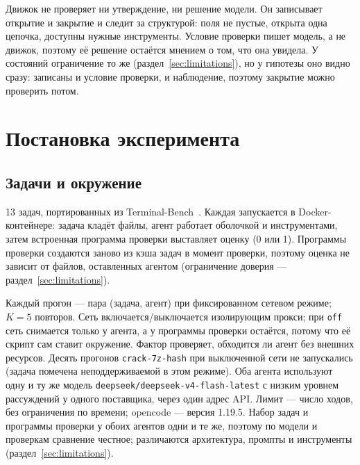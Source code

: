 \documentclass[11pt,a4paper]{article}
\begin{document}
Движок не проверяет ни утверждение, ни решение модели. Он записывает открытие и закрытие и
следит за структурой: поля не пустые, открыта одна цепочка, доступны нужные инструменты.
Условие проверки пишет модель, а не движок, поэтому её решение остаётся мнением о том, что она
увидела. У состояний ограничение то же (раздел~\ref{sec:limitations}), но у гипотезы оно
видно сразу: записаны и условие проверки, и наблюдение, поэтому закрытие можно проверить потом.

\section{Постановка эксперимента}

\subsection{Задачи и окружение}

13 задач, портированных из Terminal-Bench~\cite{terminalbench}. Каждая запускается в
Docker-контейнере: задача кладёт файлы, агент работает оболочкой и инструментами, затем
встроенная программа проверки выставляет оценку (0 или 1). Программы проверки создаются
заново из кэша задач в момент проверки, поэтому оценка не зависит от файлов, оставленных
агентом (ограничение доверия --- раздел~\ref{sec:limitations}).

Каждый прогон --- пара (задача, агент) при фиксированном сетевом режиме; $K=5$ повторов.
Сеть включается/выключается изолирующим прокси; при \texttt{off} сеть снимается только у
агента, а у программы проверки остаётся, потому что её скрипт сам ставит окружение. Фактор
проверяет, обходится ли агент без внешних ресурсов. Десять прогонов \texttt{crack-7z-hash}
при выключенной сети не запускались (задача помечена неподдерживаемой в этом режиме).
Оба агента используют одну и ту же модель \texttt{deepseek/deepseek-v4-flash-latest} с
низким уровнем рассуждений у одного поставщика, через один адрес API. Лимит --- число
ходов, без ограничения по времени; opencode --- версия 1.19.5. Набор задач и программы
проверки у обоих агентов одни и те же, поэтому по модели и проверкам сравнение честное;
различаются архитектура, промпты и инструменты (раздел~\ref{sec:limitations}).
\end{document}
